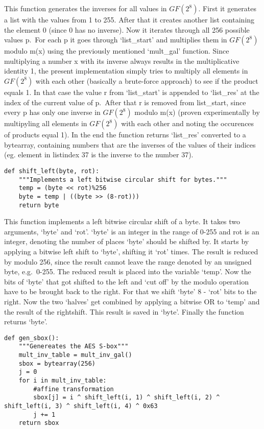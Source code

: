 This function generates the inverses for all values in $GF(2^{8})$. First it
generates a list with the values from 1 to 255. After that it creates
another list containing the element 0 (since 0 has no inverse). Now it
iterates through all 256 possible values p.~For each p it goes through
`list\_start' and multiplies them in $GF(2^{8})$ modulo m(x) using the
previously mentioned `mult\_gal' function. Since multiplying a number x
with its inverse always results in the multiplicative identity 1, the
present implementation simply tries to multiply all elements in $GF(2^{8})$
with each other (basically a brute-force approach) to see if the product
equals 1. In that case the value r from `list\_start' is appended to
`list\_res' at the index of the current value of p.~After that r is
removed from list\_start, since every p has only one inverse in $GF(2^{8})$
modulo m(x) (proven experimentally by multipyling all elements in $GF(2^{8})$
with each other and noting the occurences of products equal 1). In the
end the function returns `list\_res' converted to a bytearray,
containing numbers that are the inverses of the values of their indices
(eg. element in listindex 37 is the inverse to the number 37).

\begin{lstlisting}
def shift_left(byte, rot):
    """Implements a left bitwise circular shift for bytes."""
    temp = (byte << rot)%256
    byte = temp | ((byte >> (8-rot)))
    return byte
\end{lstlisting}

This function implements a left bitwise circular shift of a byte. It
takes two arguments, `byte' and `rot'. `byte' is an integer in the range
of 0-255 and rot is an integer, denoting the number of places `byte'
should be shifted by. It starts by applying a bitwise left shift to
`byte', shifting it `rot' times. The result is reduced by modulo 256,
since the result cannot leave the range denoted by an unsigned byte,
e.g.~0-255. The reduced result is placed into the variable `temp'. Now
the bits of `byte' that got shifted to the left and `cut off' by the
modulo operation have to be brought back to the right. For that we shift
`byte' 8 - `rot' bits to the right. Now the two `halves' get combined by
applying a bitwise OR to `temp' and the result of the rightshift. This
result is saved in `byte'. Finally the function returns `byte'.

\begin{lstlisting}
def gen_sbox():
    """Genereates the AES S-box"""
    mult_inv_table = mult_inv_gal()
    sbox = bytearray(256)
    j = 0
    for i in mult_inv_table:
        #affine transformation
        sbox[j] = i ^ shift_left(i, 1) ^ shift_left(i, 2) ^ shift_left(i, 3) ^ shift_left(i, 4) ^ 0x63
        j += 1
    return sbox
\end{lstlisting}

